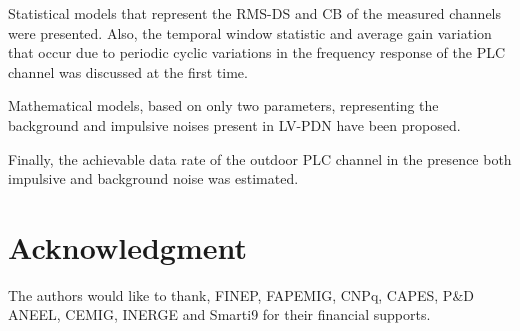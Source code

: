 \documentclass[journal]{IEEEtran}
\begin{document}
Statistical models that represent the RMS-DS and CB of the measured channels were presented. Also, the temporal window statistic and average gain variation that occur due to periodic cyclic variations in the frequency response of the \ac{PLC} channel was discussed at the first time.

Mathematical models, based on only two parameters, representing the background and impulsive noises present in \ac{LV-PDN} have been proposed.

Finally, the achievable data rate of the outdoor PLC channel in the presence both impulsive and background noise was estimated.
\section*{Acknowledgment}

The authors would like to thank, FINEP, FAPEMIG, CNPq, CAPES, P\&D
ANEEL, CEMIG, INERGE and Smarti9 for their financial supports.



\end{document}
